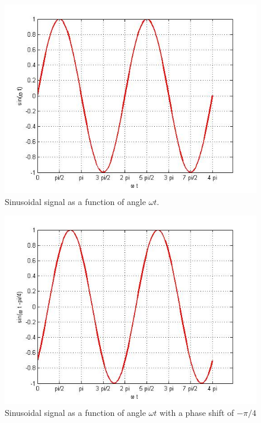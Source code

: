 \documentclass{ximera}
\begin{document}
\begin{figure}
\includegraphics[scale=0.4]{jpg/cpef3.jpg}
\caption{Sinusoidal signal as a function of angle $\omega t$.}
\label{sinPh}
\end{figure}

\begin{figure}
\includegraphics[scale=0.4]{jpg/cpef4.jpg}
\caption{Sinusoidal signal as a function of angle $\omega t$ with a phase shift of $-\pi/4$}
\label{sinMinus45Ph}
\end{figure}
\end{document}
